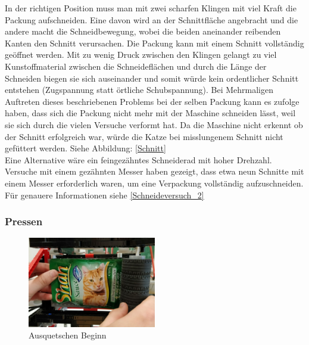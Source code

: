 In der richtigen Position muss man mit zwei scharfen Klingen mit viel Kraft die Packung aufschneiden. Eine davon wird an der Schnittfläche angebracht und die andere macht die Schneidbewegung, wobei die beiden aneinander reibenden Kanten den Schnitt verursachen. Die Packung kann mit einem Schnitt vollständig geöffnet werden. Mit zu wenig Druck zwischen den Klingen gelangt zu viel Kunstoffmaterial zwischen die Schneideflächen und durch die Länge der Schneiden biegen sie sich auseinander und somit würde  kein ordentlicher Schnitt entstehen (Zugspannung statt örtliche Schubspannung). Bei Mehrmaligen Auftreten dieses beschriebenen Problems bei der selben Packung kann es zufolge haben, dass sich die Packung nicht mehr mit der Maschine schneiden lässt, weil sie sich durch die vielen Versuche verformt hat. Da die Maschine nicht erkennt ob der Schnitt erfolgreich war, würde die Katze bei misslungenem Schnitt nicht gefüttert werden. Siehe Abbildung: \ref{Schnitt} \\

Eine Alternative wäre ein feingezähntes Schneiderad mit hoher Drehzahl. Versuche mit einem gezähnten Messer haben gezeigt, dass etwa neun Schnitte mit einem Messer erforderlich waren, um eine Verpackung vollständig aufzuschneiden. Für genauere Informationen siehe \ref{Schneideversuch_2}


\subsubsection{Pressen}

\begin{figure}
\vspace{-30pt}
  \begin{center}
    \includegraphics[width=0.50\textwidth]{Bilder/Ablauf_1_png/Ausquetschen_1}
  \end{center}
  \caption{Ausquetschen Beginn}
  \label{Ausquetschen Beginn}
  \vspace{-10pt}
\end{figure}

